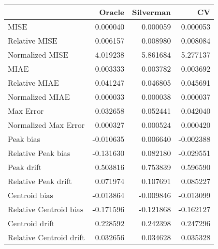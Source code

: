 \begin{tabular}{lrrr}
  \hline
 & Oracle & Silverman & CV \\ 
  \hline
MISE & 0.000040 & 0.000059 & 0.000053 \\ 
  Relative MISE & 0.006157 & 0.008980 & 0.008084 \\ 
  Normalized MISE & 4.019238 & 5.861684 & 5.277137 \\ 
  MIAE & 0.003333 & 0.003782 & 0.003692 \\ 
  Relative MIAE & 0.041247 & 0.046805 & 0.045691 \\ 
  Normalized MIAE & 0.000033 & 0.000038 & 0.000037 \\ 
  Max Error & 0.032658 & 0.052441 & 0.042040 \\ 
  Normalized Max Error & 0.000327 & 0.000524 & 0.000420 \\ 
  Peak bias & -0.010635 & 0.006640 & -0.002388 \\ 
  Relative Peak bias & -0.131630 & 0.082180 & -0.029551 \\ 
  Peak drift & 0.503816 & 0.753839 & 0.596590 \\ 
  Relative Peak drift & 0.071974 & 0.107691 & 0.085227 \\ 
  Centroid bias & -0.013864 & -0.009846 & -0.013099 \\ 
  Relative Centroid bias & -0.171596 & -0.121868 & -0.162127 \\ 
  Centroid drift & 0.228592 & 0.242398 & 0.247296 \\ 
  Relative Centroid drift & 0.032656 & 0.034628 & 0.035328 \\ 
   \hline
\end{tabular}
